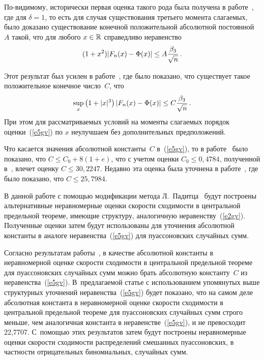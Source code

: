 \begin{multicols}{2}
По-видимому, исторически первая оценка такого рода была получена в
работе~\cite{Meshalkin}, где для $\delta=1$, то есть для случая
существования третьего момента слагаемых, было доказано
существование конечной положительной абсолютной постоянной~$A$
такой, что для любого $x\in\mathbb R$ справедливо неравенство
$$
(1+x^2)|F_n(x)-\Phi(x)|\le A\displaystyle\frac{\displaystyle \beta_3\mathstrut}{\displaystyle \sqrt{n}\mathstrut}\,.
$$

Этот результат был усилен в работе~\cite{Nagaev}, где было
показано, что существует такое положительное конечное число~$C$,
что
\begin{equation}
\sup_x\left(1+|x|^{3}\right)\left|F_n(x)-\Phi(x)\right|\le
C\displaystyle\frac{\displaystyle \beta_{3}\mathstrut}{\displaystyle \sqrt{n}\mathstrut}\,.\label{e5gv}
\end{equation}
При этом для рассматриваемых условий на моменты слагаемых порядок
оценки~(\ref{e5gv}) по $x$ неулучшаем без дополнительных предположений.

Что касается значения абсолютной константы~$C$ в~(\ref{e5gv}), то в работе~\cite{Mich81} 
было показано, что $C\le C_0+8(1+e)$, что с учетом
оценки $C_0\le 0{,}4784$, полученной в~\cite{KorolevBEs, KorSchev}, влечет оценку $C\le
30{,}2247$. Недавно эта оценка была уточнена в работе~\cite{Nefedova},
где было показано, что $C \le 25{,}7984$.

В данной работе с помощью модификации метода Л.~Падитца~\cite{Paditz89} будут построены альтернативные неравномерные
оценки скорости сходимости в центральной предельной теореме,
имеющие структуру, аналогичную неравенству~(\ref{e2gv}). Полученные оценки
затем будут использованы для уточнения абсолютной константы в
аналоге неравенства~(\ref{e5gv}) для пуассоновских случайных сумм.

Согласно результатам работы~\cite{Mich93}, в качестве абсолютной
константы в неравномерной оценке скорости сходимости в центральной
предельной тео\-ре\-ме для пуассоновских случайных сумм можно брать
абсолютную константу~$C$ из неравенства~(\ref{e5gv}). В~предлагаемой статье
с использованием упомянутых выше структурных уточнений неравенства~(\ref{e5gv})\linebreak 
будет показано, что на самом деле абсолютная константа в
неравномерной оценке ско\-рости схо\-ди\-мости в центральной предельной
теореме для пуассоновских случайных сумм строго меньше, чем\linebreak
аналогичная константа в неравенстве~(\ref{e5gv}), и не превосходит
22,7707. С~помощью этих результатов затем будут построены
неравномерные оценки скорости сходимости распределений смешанных
пуассоновских, в частности отрицательных биномиальных, случайных
сумм.


\end{multicols}
